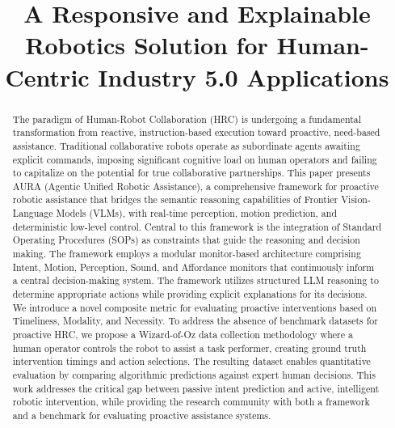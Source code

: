 \documentclass[11pt, a4paper]{article}
\title{A Responsive and Explainable Robotics Solution for Human-Centric Industry 5.0 Applications}
\begin{document}
\maketitle

\begin{abstract}
The paradigm of Human-Robot Collaboration (HRC) is undergoing a fundamental transformation from reactive, instruction-based execution toward proactive, need-based assistance. Traditional collaborative robots operate as subordinate agents awaiting explicit commands, imposing significant cognitive load on human operators and failing to capitalize on the potential for true collaborative partnerships. This paper presents AURA (Agentic Unified Robotic Assistance), a comprehensive framework for proactive robotic assistance that bridges the semantic reasoning capabilities of Frontier Vision-Language Models (VLMs), with real-time perception, motion prediction, and deterministic low-level control. Central to this framework is the integration of Standard Operating Procedures (SOPs) as constraints that guide the reasoning and decision making. The framework employs a modular monitor-based architecture comprising Intent, Motion, Perception, Sound, and Affordance monitors that continuously inform a central decision-making system. The framework utilizes structured LLM reasoning to determine appropriate actions while providing explicit explanations for its decisions. We introduce a novel composite metric for evaluating proactive interventions based on Timeliness, Modality, and Necessity. To address the absence of benchmark datasets for proactive HRC, we propose a Wizard-of-Oz data collection methodology where a human operator controls the robot to assist a task performer, creating ground truth intervention timings and action selections. The resulting dataset enables quantitative evaluation by comparing algorithmic predictions against expert human decisions. This work addresses the critical gap between passive intent prediction and active, intelligent robotic intervention, while providing the research community with both a framework and a benchmark for evaluating proactive assistance systems.
\end{abstract}
\end{document}
